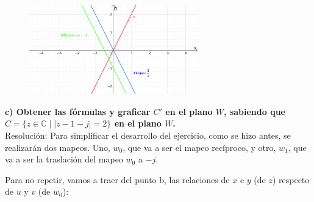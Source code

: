 \documentclass[12pt]{report}
\begin{document}
\begin{figure}[h] %
    \centering %
    \includegraphics[width=0.65\textwidth]{./Imagenes/foto1Ej3.png} %
\end{figure}

\textbf{c) Obtener las fórmulas y graficar \( C' \) en el plano \( W \), sabiendo que \( C = \{z \in \mathbb{C} \mid |z - 1 - j| = 2\} \) en el plano \( W \).}\\[6pt]

Resolución: Para simplificar el desarrollo del ejercicio, como se hizo antes, se realizarán dos mapeos. Uno, \( w_0 \), que va a ser el mapeo recíproco, y otro, \( w_1 \), que va a ser la traslación del mapeo \( w_0 \) a \( -j \).

Para no repetir, vamos a traer del punto b, las relaciones de \( x \) e \( y \) (de \( z \)) respecto de \( u \) y \( v \) (de \( w_0 \)):
\end{document}
